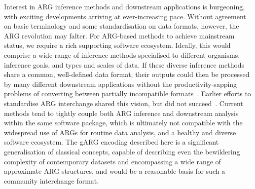 \documentclass{article}
\begin{document}
Interest in ARG inference methods and downstream applications is
burgeoning, with exciting developments arriving at ever-increasing pace.
Without agreement on basic terminology and some standardisation
on data formats, however, the ARG revolution may falter.
For ARG-based methods to achieve mainstream status, we require
a rich supporting software ecosystem.
Ideally, this would comprise a wide range of
inference methods specialised to different organisms,
inference goals, and types and scales of data.
If these diverse inference methods share a common,
well-defined data format, their outputs could then be
processed by many different downstream applications
without the productivity-sapping problems
of converting between partially incompatible
formats~\citep{excoffier2006computer}.
Earlier efforts to standardise ARG interchange shared this vision,
but did not succeed~\citep{cardona2008extended,mcgill2013graphml}.
Current methods tend to tightly couple both ARG inference and downstream
analysis within the same software package,
which is ultimately not compatible with the widespread use
of ARGs for routine data analysis, and a healthy and diverse software ecosystem.
The gARG encoding described here is a significant generalisation
of classical concepts, capable of describing even the bewildering complexity
of contemporary datasets and encompassing a wide range of approximate
ARG structures, and would be a reasonable basis for such a community
interchange format.
\end{document}
